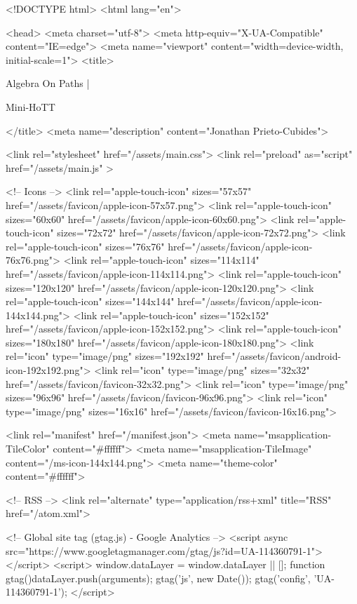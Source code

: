 <!DOCTYPE html>
<html lang="en">

<head>
  <meta charset="utf-8">
  <meta http-equiv="X-UA-Compatible" content="IE=edge">
  <meta name="viewport" content="width=device-width, initial-scale=1">
  <title>
    
      
        Algebra On Paths |
      
        Mini-HoTT
    
  </title>
  <meta name="description" content="Jonathan Prieto-Cubides">

  <link rel="stylesheet" href="/assets/main.css">
  <link rel="preload" as="script" href="/assets/main.js" >

  <!-- Icons -->
  <link rel="apple-touch-icon" sizes="57x57" href="/assets/favicon/apple-icon-57x57.png">
  <link rel="apple-touch-icon" sizes="60x60" href="/assets/favicon/apple-icon-60x60.png">
  <link rel="apple-touch-icon" sizes="72x72" href="/assets/favicon/apple-icon-72x72.png">
  <link rel="apple-touch-icon" sizes="76x76" href="/assets/favicon/apple-icon-76x76.png">
  <link rel="apple-touch-icon" sizes="114x114" href="/assets/favicon/apple-icon-114x114.png">
  <link rel="apple-touch-icon" sizes="120x120" href="/assets/favicon/apple-icon-120x120.png">
  <link rel="apple-touch-icon" sizes="144x144" href="/assets/favicon/apple-icon-144x144.png">
  <link rel="apple-touch-icon" sizes="152x152" href="/assets/favicon/apple-icon-152x152.png">
  <link rel="apple-touch-icon" sizes="180x180" href="/assets/favicon/apple-icon-180x180.png">
  <link rel="icon" type="image/png" sizes="192x192"  href="/assets/favicon/android-icon-192x192.png">
  <link rel="icon" type="image/png" sizes="32x32" href="/assets/favicon/favicon-32x32.png">
  <link rel="icon" type="image/png" sizes="96x96" href="/assets/favicon/favicon-96x96.png">
  <link rel="icon" type="image/png" sizes="16x16" href="/assets/favicon/favicon-16x16.png">

  <link rel="manifest" href="/manifest.json">
  <meta name="msapplication-TileColor" content="#ffffff">
  <meta name="msapplication-TileImage" content="/ms-icon-144x144.png">
  <meta name="theme-color" content="#ffffff">

  <!-- RSS -->
  <link rel="alternate" type="application/rss+xml" title="RSS" href="/atom.xml">

  <!-- Global site tag (gtag.js) - Google Analytics -->
  <script async src="https://www.googletagmanager.com/gtag/js?id=UA-114360791-1"></script>
  <script>
    window.dataLayer = window.dataLayer || [];
    function gtag(){dataLayer.push(arguments);}
    gtag('js', new Date());
    gtag('config', 'UA-114360791-1');
  </script>

